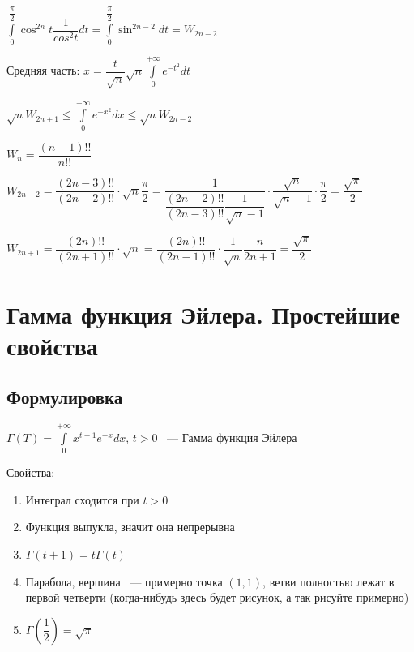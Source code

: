 \documentclass{article}
\begin{document}
            $\int\limits^{\dfrac{\pi}{2}}_0 \cos^{2n} t \dfrac{1}{cos^2 t} dt = \int\limits^{\dfrac{\pi}{2}}_0 \sin^{2n - 2} dt = W_{2n - 2}$
            
            Средняя часть: $x = \dfrac{t}{\sqrt{n}} \sqrt{n} \int\limits^{+\infty}_0 e^{-t^2} dt$
            
            $\sqrt{n} W_{2n + 1} \leq \int\limits^{+\infty}_0 e^{-x^2} dx \leq \sqrt{n} W_{2n - 2}$
            
            $W_n = \dfrac{(n - 1)!!}{n!!}$
            
            $W_{2n - 2} = \dfrac{(2n - 3)!!}{(2n - 2)!!} \cdot \sqrt{n} \dfrac{\pi}{2} = \dfrac{1}{\dfrac{(2n - 2)!!}{(2n - 3)!!} \dfrac{1}{\sqrt{n} - 1}} \cdot \dfrac{\sqrt{n}}{\sqrt{n} - 1} \cdot \dfrac{\pi}{2} = \dfrac{\sqrt{\pi}}{2}$
            
            $W_{2n + 1} = \dfrac{(2n)!!}{(2n + 1)!!} \cdot \sqrt{n} = \dfrac{(2n)!!}{(2n - 1)!!} \cdot \dfrac{1}{\sqrt{n}} \dfrac{n}{2n + 1} = \dfrac{\sqrt{\pi}}{2}$
            
            
    \newpage
    
    \section{Гамма функция Эйлера. Простейшие свойства}
    
        \subsection{Формулировка}
        
            $\Gamma(T) = \int\limits^{+\infty}_0 x^{t - 1} e^{-x} dx$, $t > 0$ ~--- Гамма функция Эйлера
            
            Свойства:
            
            \begin{enumerate}
            
                \item Интеграл сходится при $t > 0$
                
                \item Функция выпукла, значит она непрерывна
                
                \item $\Gamma(t + 1) = t \Gamma (t)$
                
                \item Парабола, вершина ~--- примерно точка $(1, 1)$, ветви полностью лежат в первой четверти (когда-нибудь здесь будет рисунок, а так рисуйте примерно)
                
                \item $\Gamma \left( \dfrac{1}{2} \right) = \sqrt{\pi}$
                
            \end{enumerate}
            
\end{document}
